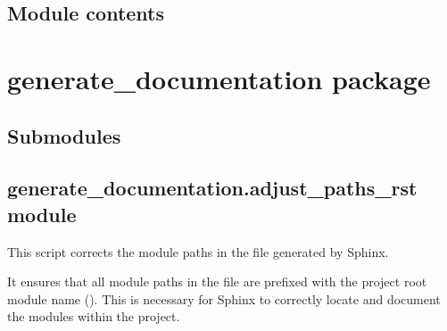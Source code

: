 \documentclass[letterpaper,10pt,english]{sphinxmanual}
\begin{document}
\subsection{Module contents}
\label{\detokenize{app:module-app}}\label{\detokenize{app:module-contents}}
\sphinxstepscope


\section{generate\_documentation package}
\label{\detokenize{generate_documentation:generate-documentation-package}}\label{\detokenize{generate_documentation::doc}}

\subsection{Submodules}
\label{\detokenize{generate_documentation:submodules}}

\subsection{generate\_documentation.adjust\_paths\_rst module}
\label{\detokenize{generate_documentation:module-generate_documentation.adjust_paths_rst}}\label{\detokenize{generate_documentation:generate-documentation-adjust-paths-rst-module}}
\sphinxAtStartPar
This script corrects the module paths in the  file generated by Sphinx.

\sphinxAtStartPar
It ensures that all module paths in the  file are prefixed with the project root 
module name (). This is necessary for Sphinx to correctly locate and document 
the modules within the project.
\end{document}
